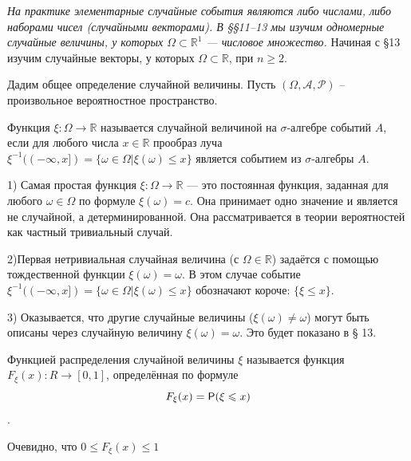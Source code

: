 \textit{На практике элементарные случайные события являются либо числами, либо наборами чисел (случайными векторами). В \S\S 11–13 мы изучим
одномерные случайные величины, у которых $\Omega\subset\mathbb{R}^1$ — числовое множество.} Начиная с \S 13 изучим случайные векторы, у которых  
$\Omega\subset\mathbb{R}$, при $n \geqslant 2$.

Дадим общее определение случайной величины. Пусть $(\Omega, \mathcal{A}, \mathcal{P})$ -- произвольное вероятностное пространство.

\begin{definition}
\label{def:11.1}
	Функция $\xi : \Omega \rightarrow \mathbb{R}$ называется случайной величиной на $\sigma$-алгебре событий $A$, если для любого числа $x\in\mathbb{R}$ прообраз луча
	$\xi^{-1}((-\infty,x])=\{\omega\in\Omega|\xi(\omega)\leqslant x\}$
	 является событием из $\sigma$-алгебры $A$.
\end{definition}

\begin{zam}
\label{zam:11.2}
	
1) Самая простая функция $\xi : \Omega \rightarrow \mathbb{R}$ — это постоянная функция, заданная для любого $\omega \in \Omega$ по формуле $\xi(\omega)=c$. Она
принимает одно значение и является не случайной, а детерминированной.
Она рассматривается в теории вероятностей как частный тривиальный
случай.

2)Первая нетривиальная случайная величина (с $\Omega \in \mathbb{R}$) задаётся
с помощью тождественной функции $\xi(\omega) = \omega$. В этом случае событие
$\xi^{-1}((-\infty,x])=\{\omega\in\Omega|\xi(\omega)\leqslant x\}$ обозначают короче: $\{\xi \leqslant x\}$.

3) Оказывается, что другие случайные величины ($\xi(\omega) \neq \omega$) могут быть
описаны через случайную величину $\xi(\omega) = \omega$. Это будет показано в § 13.
\end{zam}

\begin{definition}
\label{def:11.3}
	Функцией распределения случайной величины $\xi$ называется функция $F_{\xi}(x) : R \rightarrow [0, 1]$, определённая по формуле
$$F_{\xi}(x)=\P(\xi\leqslant x)$$.
\end{definition}

Очевидно, что $0\leqslant F_{\xi}(x)\leqslant 1$

